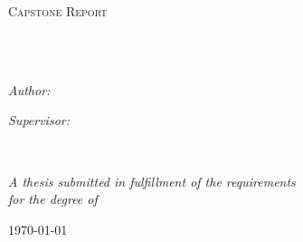 \documentclass[
hidelinks,
12pt, %
oneside, %
english, %
doublespacing, %
headsepline, %
]{MastersDoctoralThesis} %
\author{Hrishi \textsc{Olickel}} %
\begin{document}
\frontmatter %

\pagestyle{plain} %


\begin{titlepage}
\begin{center}

\vspace*{.06\textheight}
{\scshape\LARGE \univname\par}\vspace{1.5cm} %
\textsc{\Large Capstone Report}\\[0.5cm] %

\HRule \\[0.4cm] %
{\huge \bfseries \ttitle\par}\vspace{0.4cm} %
\HRule \\[1.5cm] %

\begin{minipage}[t]{0.4\textwidth}
\begin{flushleft} \large
\emph{Author:}\\
{\authorname} %
\end{flushleft}
\end{minipage}
\begin{minipage}[t]{0.4\textwidth}
\begin{flushright} \large
\emph{Supervisor:} \\
{\supname} %
\end{flushright}
\end{minipage}\\[3cm]

\vfill

\large \textit{A thesis submitted in fulfillment of the requirements\\ for the degree of \degreename}\\[0.3cm] %

\vfill

{\large \today}\\[4cm] %

\vfill
\end{center}
\end{titlepage}
\end{document}
